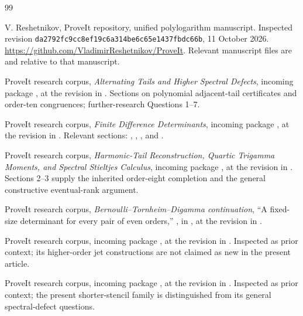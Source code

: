 \begin{thebibliography}{99}
\raggedright

V. Reshetnikov, ProveIt repository, unified polylogarithm manuscript.
Inspected revision
\texttt{da2792fc9cc8ef19c6a314be6c65e1437fbdc66b},
11 October 2026.
\url{https://github.com/VladimirReshetnikov/ProveIt}.
Relevant manuscript files are
and  relative to that manuscript.

ProveIt research corpus,
\emph{Alternating Tails and Higher Spectral Defects},
incoming package
,
at the revision in \cite{ProveItPin}.
Sections on polynomial adjacent-tail certificates and order-ten
congruences; further-research Questions 1--7.

ProveIt research corpus, \emph{Finite Difference Determinants},
incoming package
,
at the revision in \cite{ProveItPin}.
Relevant sections:
,
,
, and
.

ProveIt research corpus,
\emph{Harmonic-Tail Reconstruction, Quartic Trigamma Moments,
and Spectral Stieltjes Calculus},
incoming package
,
at the revision in \cite{ProveItPin}.
Sections 2--3 supply the inherited order-eight completion and the
general constructive eventual-rank argument.

ProveIt research corpus, \emph{Bernoulli--Tornheim--Digamma continuation},
``A fixed-size determinant for every pair of even orders,''
, in
,
at the revision in \cite{ProveItPin}.

ProveIt research corpus,
incoming package
,
at the revision in \cite{ProveItPin}.
Inspected as prior context; its higher-order jet constructions are
not claimed as new in the present article.

ProveIt research corpus,
incoming package
,
at the revision in \cite{ProveItPin}.
Inspected as prior context; the present shorter-stencil family is
distinguished from its general spectral-defect questions.


\end{thebibliography}
